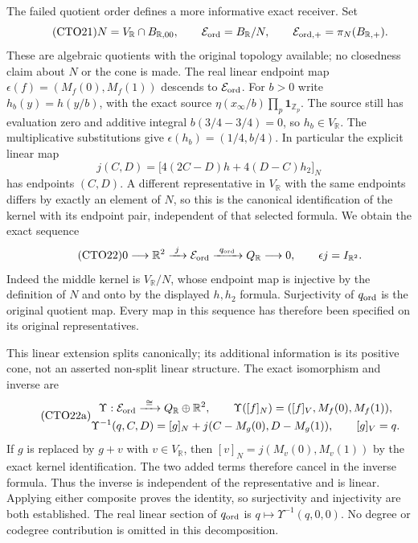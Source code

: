 The failed quotient order defines a more informative exact receiver.
Set
\begin{equation}\tag{CTO21}
N=V_{\mathbb R}\cap B_{\mathbb R,00},\qquad
\mathcal E_{\rm ord}=B_{\mathbb R}/N,\qquad
\mathcal E_{{\rm ord},+}=\pi_N(B_{\mathbb R,+}).
\end{equation}
These are algebraic quotients with the original topology available;
no closedness claim about $N$ or the cone is made. The real linear
endpoint map $\epsilon(f)=(M_f(0),M_f(1))$ descends to
$\mathcal E_{\rm ord}$.
For $b>0$ write $h_b(y)=h(y/b)$, with the exact source
$\eta(x_\infty/b)\prod_p\mathbf1_{\mathbb Z_p}$.
The source still has evaluation zero and additive integral
$b(3/4-3/4)=0$, so $h_b\in V_{\mathbb R}$.
The multiplicative substitutions give
$\epsilon(h_b)=(1/4,b/4)$. In particular the explicit linear map
\[
j(C,D)=\bigl[4(2C-D)h+4(D-C)h_2\bigr]_N
\]
has endpoints $(C,D)$. A different representative in $V_{\mathbb R}$
with the same endpoints differs by exactly an element of $N$,
so this is the canonical identification of the kernel with its
endpoint pair, independent of that selected formula. We obtain
the exact sequence
\begin{equation}\tag{CTO22}
0\longrightarrow\mathbb R^2
 \xrightarrow{\ j\ }\mathcal E_{\rm ord}
 \xrightarrow{\ q_{\rm ord}\ }Q_{\mathbb R}
 \longrightarrow0,
\qquad \epsilon j=I_{\mathbb R^2}.
\end{equation}
Indeed the middle kernel is $V_{\mathbb R}/N$, whose endpoint
map is injective by the definition of $N$ and onto by the
displayed $h,h_2$ formula. Surjectivity of $q_{\rm ord}$ is
the original quotient map. Every map in this sequence has
therefore been specified on its original representatives.

This linear extension splits canonically; its additional information
is its positive cone, not an asserted non-split linear structure.
The exact isomorphism and inverse are
\begin{equation}\tag{CTO22a}
\begin{gathered}
\Upsilon:\mathcal E_{\rm ord}\xrightarrow{\ \cong\ }
          Q_{\mathbb R}\oplus\mathbb R^2,\qquad
\Upsilon([f]_N)=([f]_V,M_f(0),M_f(1)),\\
\Upsilon^{-1}(q,C,D)
=[g]_N+j(C-M_g(0),D-M_g(1)),\qquad [g]_V=q.
\end{gathered}
\end{equation}
If $g$ is replaced by $g+v$ with $v\in V_{\mathbb R}$, then
$[v]_N=j(M_v(0),M_v(1))$ by the exact kernel identification.
The two added terms therefore cancel in the inverse formula.
Thus the inverse is independent of the representative and is
linear. Applying either composite proves the identity, so
surjectivity and injectivity are both established. The real
linear section of $q_{\rm ord}$ is $q\mapsto\Upsilon^{-1}(q,0,0)$.
No degree or codegree contribution is omitted in this decomposition.


